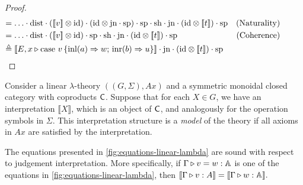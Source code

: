 \begin{proof}
\begin{align*}
  & \hspace{-30pt} = \ldots \comp \dist \comp  ([\![v]\!] \otimes \id)  \comp ( \id \otimes \text{jn} \comp \text{sp}) \comp \text{sp}  \comp \text{sh}    \comp \text{jn} \comp (\id \otimes [\![ t ]\!] ) \comp \text{sp} & {(\text{Naturality})}   \\
  & \hspace{-30pt} =  \ldots  \comp \dist   \comp ([\![v  ]\!] \otimes \id) \comp \text{sp} \comp \text{sh} \comp \text{jn} \comp (\id \otimes [\![ t ]\!] ) \comp \text{sp}  & {(\text{Coherence})}     \\ 
  & \hspace{-30pt} \triangleq  [\![E,  x\vljud \text{case } v\,  \{\text{inl} (a) \Rightarrow w ;\, \text{inr} (b) \Rightarrow u\}]\!] \comp \text{jn} \comp (\id \otimes [\![ t ]\!] ) \comp \text{sp}
\end{align*}




\end{proof}

\begin{definition} 
Consider a linear \(\lambda\)-theory \(((G, \Sigma), Ax)\) and a symmetric monoidal closed category with coproducts \(\mathsf{C}\). 
Suppose that for each \(X \in G\), we have an interpretation \(\llbracket X \rrbracket\), which is an object of \(\mathsf{C}\), 
and analogously for the operation symbols in \(\Sigma\). 
This interpretation structure is a \emph{model} of the theory if all axioms in \(Ax\) are satisfied by the interpretation.
\end{definition}




\begin{theorem} \label{thm:soundness_classical}
The equations presented in \autoref{fig:equations-linear-lambda} are sound with respect to judgement interpretation. 
More specifically, if \(\Gamma \triangleright v = w : \mathbb{A}\) is one of the equations in \autoref{fig:equations-linear-lambda}, then 
$\llbracket \Gamma \triangleright v : A  \rrbracket = \llbracket  \Gamma \triangleright w : \mathbb{A}\rrbracket.$
\end{theorem}


